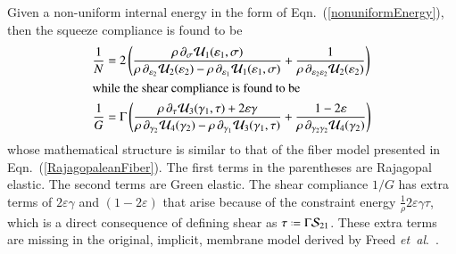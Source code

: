 Given a non-uniform internal energy in the form of Eqn.~(\ref{nonuniformEnergy}), then the squeeze compliance is found to be
\begin{subequations}
    \label{nonuniformCompliances}
    \begin{align}
    \frac{1}{N} & = 2 \left( \frac{\rho \, \partial_{\sigma} \hspace{0.5pt} \mathcal{U}_1 ( \varepsilon_1 , \sigma )}{\rho \, \partial_{\varepsilon_2} \hspace{0.5pt} \mathcal{U}_2 ( \varepsilon_2 ) - \rho \, \partial_{\varepsilon_1} \hspace{0.5pt} \mathcal{U}_1 ( \varepsilon_1 , \sigma )} + \frac{1}{\rho \, \partial_{\varepsilon_2 \varepsilon_2} \mathcal{U}_2 ( \varepsilon_2 )} \right) 
    \label{squeezeCompliance} \\
    \intertext{while the shear compliance is found to be}
    \frac{1}{G} & = \Gamma \left( \frac{\rho \, \partial_{\tau} \hspace{0.5pt} \mathcal{U}_3 ( \gamma_1 , \tau ) + 2 \varepsilon \gamma}{\rho \, \partial_{\gamma_2} \hspace{0.5pt} \mathcal{U}_4 ( \gamma_2 ) - \rho \, \partial_{\gamma_1} \hspace{0.5pt} \mathcal{U}_3 ( \gamma_1 , \tau )} + \frac{1 - 2\varepsilon}{\rho \, \partial_{\gamma_2 \gamma_2} \mathcal{U}_4 ( \gamma_2 )} \right)
    \label{shearCompliance}
    \end{align}
\end{subequations}
whose mathematical structure is similar to that of the fiber model presented in Eqn.~(\ref{RajagopaleanFiber}).  The first terms in the parentheses are Rajagopal elastic. The second terms are Green elastic.  The shear compliance $1/G$ has extra terms of $2 \varepsilon \gamma$ and $(1 - 2\varepsilon)$ that arise because of the constraint energy $\tfrac{1}{\rho} 2 \varepsilon \gamma \tau$, which is a direct consequence of defining shear as $\tau \defeq \Gamma \mathcal{S}_{21}$.  These extra terms are missing in the original, implicit, membrane model derived by Freed \textit{et~al}.~\cite{Freedetal17}.

